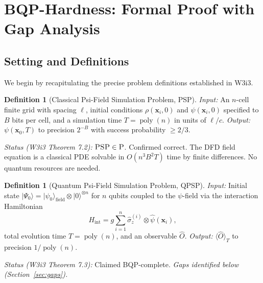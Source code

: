 \documentclass[11pt]{article}
\theoremstyle{definition}
\newtheorem{definition}[theorem]{Definition}
\theoremstyle{remark}
\newcommand{\PP}{\textsc{P}}
\newcommand{\PSP}{\textsc{PSP}}
\newcommand{\QPSP}{\textsc{QPSP}}
\DeclareMathOperator{\poly}{poly}
\begin{document}
\section{BQP-Hardness: Formal Proof with Gap Analysis}
\label{sec:bqp_hardness}

\subsection{Setting and Definitions}

We begin by recapitulating the precise problem definitions established
in W3i3.

\begin{definition}[Classical Psi-Field Simulation Problem, \PSP]
\label{def:psp}
\textit{Input:} An $n$-cell finite grid with spacing $\ell$, initial
conditions $\rho(\mathbf{x}_i, 0)$ and $\psi(\mathbf{x}_i, 0)$ specified
to $B$ bits per cell, and a simulation time $T = \poly(n)$ in units of
$\ell/c$.
\textit{Output:} $\psi(\mathbf{x}_0, T)$ to precision $2^{-B}$ with
success probability $\geq 2/3$.

\textit{Status (W3i3 Theorem 7.2):} $\PSP \in \PP$. Confirmed correct.
The DFD field equation is a classical PDE solvable in $O(n^3 B^2 T)$
time by finite differences. No quantum resources are needed.
\end{definition}

\begin{definition}[Quantum Psi-Field Simulation Problem, \QPSP]
\label{def:qpsp}
\textit{Input:} Initial state $|\Psi_0\rangle = |\psi_0\rangle_{\mathrm{field}}
\otimes |0\rangle^{\otimes n}$ for $n$ qubits coupled to the $\psi$-field
via the interaction Hamiltonian
\begin{equation}
H_{\mathrm{int}} = g\sum_{i=1}^n \hat{\sigma}_z^{(i)}\otimes\hat{\psi}(\mathbf{x}_i),
\label{eq:hint}
\end{equation}
total evolution time $T = \poly(n)$, and an observable $\hat{O}$.
\textit{Output:} $\langle \hat{O} \rangle_T$ to precision $1/\poly(n)$.

\textit{Status (W3i3 Theorem 7.3):} Claimed BQP-complete.
\textit{Gaps identified below (Section~\ref{sec:gaps}).}
\end{definition}
\end{document}
